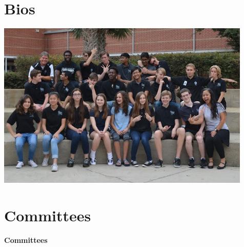 \documentclass[
letterpaper, %
11pt, %
twoside,
onecolumn, %
openany, %
]{report}
\begin{document}
\cleardoublepage
\chapter{Bios}
\vspace{3em}
\begin{minipage}[c]{\linewidth}
\centering
\includegraphics[width=\linewidth]{Images/Team/Team_Bios.PNG}
\end{minipage}














% 
% 


 
% 



                                                    
\cleardoublepage
\chapter*{Committees} 
\pagestyle{plain}
\noindent\textbf{\Huge Committees}
\newline
\end{document}
